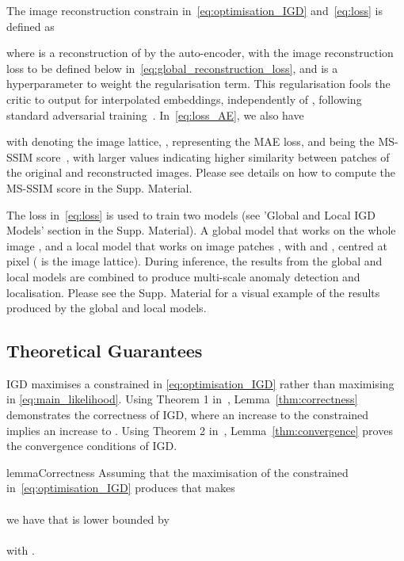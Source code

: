 \documentclass[letterpaper]{article} \usepackage{aaai22}  \usepackage{times}  \usepackage{helvet}  \usepackage{courier}  \usepackage[hyphens]{url}  \usepackage{graphicx} \urlstyle{rm} \def\UrlFont{\rm}  \usepackage{natbib}  \usepackage{caption} \DeclareCaptionStyle{ruled}{labelfont=normalfont,labelsep=colon,strut=off} \frenchspacing  \setlength{\pdfpagewidth}{8.5in}  \setlength{\pdfpageheight}{11in}  \usepackage{algorithm}
\begin{document}
The image reconstruction constrain  in~\eqref{eq:optimisation_IGD} and~\eqref{eq:loss} is defined as

where  is a reconstruction of  by the auto-encoder, with the image reconstruction loss  to be defined below  in~\eqref{eq:global_reconstruction_loss}, and
 is a hyperparameter to weight the regularisation term. This regularisation fools the critic to output  for interpolated embeddings, independently of , following standard adversarial training~\cite{gan}.
In~\eqref{eq:loss_AE}, we also have

with  denoting the image lattice, ,
 representing the MAE loss, and
 being the MS-SSIM score~\cite{MS-SSIM}, with larger values indicating higher similarity between patches  of the original and reconstructed images. 
Please see details on how to compute the MS-SSIM score in the Supp. Material.




The loss in~\eqref{eq:loss} is used to train two models (see 'Global and Local IGD Models' section in the Supp. Material). A global model that works on the whole image , and a local model that works on image patches , with  and , centred at pixel  ( is the image lattice).
During inference, the results from the global and local models are combined to produce multi-scale anomaly detection and localisation. Please see the Supp. Material for a visual example of the results produced by the global and local models.








\subsection{Theoretical Guarantees}

 IGD maximises a constrained  in \eqref{eq:optimisation_IGD} rather than maximising  in \eqref{eq:main_likelihood}.  
 Using Theorem 1 in~\citep{dempster1977maximum}, Lemma~\ref{thm:correctness} demonstrates the correctness of IGD, where an increase to the constrained  implies an increase to .
Using Theorem 2 in~\citep{dempster1977maximum}, Lemma~\ref{thm:convergence} proves the convergence conditions of IGD. 

\begin{restatable}[]{lemma}{Correctness}
    \label{thm:correctness}
    Assuming that the maximisation of the constrained  in~\eqref{eq:optimisation_IGD} produces  that makes\\ 
    \scalebox{0.87}{
    ,} \\we have that 
    \scalebox{0.87}{} 
    is lower bounded by\\
    \scalebox{0.8}{
    ,} \\
    with .
 \end{restatable}
 
\end{document}
